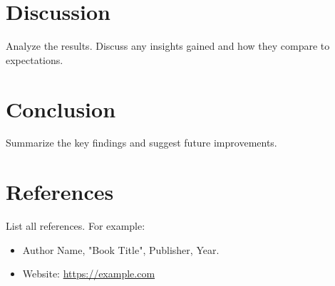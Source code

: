 \documentclass[a4paper,12pt]{article}
\begin{document}
\section{Discussion}
Analyze the results. Discuss any insights gained and how they compare to expectations.

\section{Conclusion}
Summarize the key findings and suggest future improvements.

\section{References}
List all references. For example:

\begin{itemize}
    \item Author Name, "Book Title", Publisher, Year.
    \item Website: \url{https://example.com}
\end{itemize}
\end{document}
